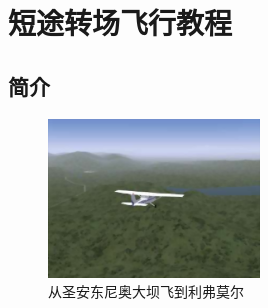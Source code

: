 
\ifchinese
\chapter{{\\}短途转场飞行教程}
\fi

\label{crosscountry}


\ifchinese
\section{简介}

\begin{figure}[!htp]
\centering
\includegraphics[width=0.5\textwidth]{antonio2}
\caption{从圣安东尼奥大坝飞到利弗莫尔}
\end{figure}

